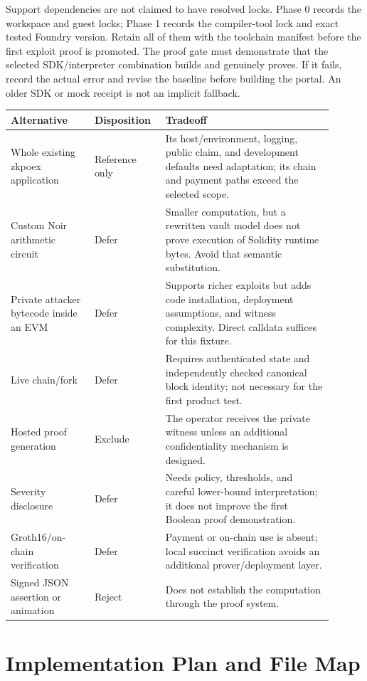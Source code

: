 \documentclass[11pt]{article}
\begin{document}
Support dependencies are not claimed to have resolved locks. Phase 0 records the workspace and guest locks; Phase 1 records the compiler-tool lock and exact tested Foundry version. Retain all of them with the toolchain manifest before the first exploit proof is promoted. The proof gate must demonstrate that the selected SDK/interpreter combination builds and genuinely proves. If it fails, record the actual error and revise the baseline before building the portal. An older SDK or mock receipt is not an implicit fallback.

\begin{longtable}{L{0.24\linewidth}L{0.18\linewidth}L{0.48\linewidth}}
\toprule
\textbf{Alternative} & \textbf{Disposition} & \textbf{Tradeoff} \\
\midrule
\endhead
Whole existing zkpoex application & Reference only & Its host/environment, logging, public claim, and development defaults need adaptation; its chain and payment paths exceed the selected scope. \\
Custom Noir arithmetic circuit & Defer & Smaller computation, but a rewritten vault model does not prove execution of Solidity runtime bytes. Avoid that semantic substitution. \\
Private attacker bytecode inside an EVM & Defer & Supports richer exploits but adds code installation, deployment assumptions, and witness complexity. Direct calldata suffices for this fixture. \\
Live chain/fork & Defer & Requires authenticated state and independently checked canonical block identity; not necessary for the first product test. \\
Hosted proof generation & Exclude & The operator receives the private witness unless an additional confidentiality mechanism is designed. \\
Severity disclosure & Defer & Needs policy, thresholds, and careful lower-bound interpretation; it does not improve the first Boolean proof demonstration. \\
Groth16/on-chain verification & Defer & Payment or on-chain use is absent; local succinct verification avoids an additional prover/deployment layer. \\
Signed JSON assertion or animation & Reject & Does not establish the computation through the proof system. \\
\bottomrule
\end{longtable}

\section{Implementation Plan and File Map}
\end{document}
